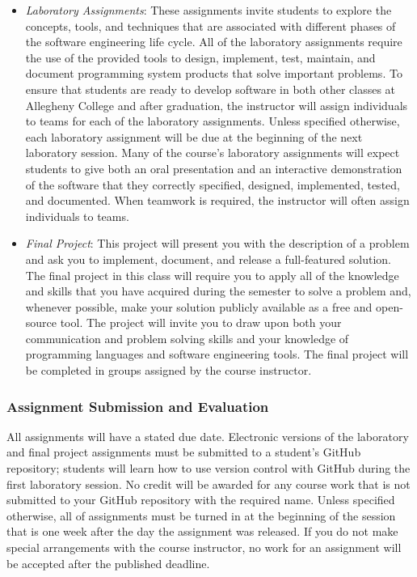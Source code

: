 \documentclass[11pt]{article}
\begin{document}
\begin{itemize}
  \item {\em Laboratory Assignments\/}: These assignments invite students to explore the concepts, tools, and techniques
    that are associated with different phases of the software engineering life cycle. All of the laboratory assignments
    require the use of the provided tools to design, implement, test, maintain, and document programming system products
    that solve important problems. To ensure that students are ready to develop software in both other classes at
    Allegheny College and after graduation, the instructor will assign individuals to teams for each of the laboratory
    assignments. Unless specified otherwise, each laboratory assignment will be due at the beginning of the next
    laboratory session. Many of the course's laboratory assignments will expect students to give both an oral
    presentation and an interactive demonstration of the software that they correctly specified, designed, implemented,
    tested, and documented. When teamwork is required, the instructor will often assign individuals to teams.

  \item {\em Final Project\/}: This project will present you with the description of a problem and ask you to implement,
    document, and release a full-featured solution. The final project in this class will require you to apply all of the
    knowledge and skills that you have acquired during the semester to solve a problem and, whenever possible, make your
    solution publicly available as a free and open-source tool. The project will invite you to draw upon both your
    communication and problem solving skills and your knowledge of programming languages and software engineering tools.
    The final project will be completed in groups assigned by the course instructor.

\end{itemize}

\subsubsection*{Assignment Submission and Evaluation}

All assignments will have a stated due date. Electronic versions of the laboratory and final project assignments must be
submitted to a student's GitHub repository; students will learn how to use version control with GitHub during the first
laboratory session. No credit will be awarded for any course work that is not submitted to your GitHub repository with
the required name. Unless specified otherwise, all of assignments must be turned in at the beginning of the session that
is one week after the day the assignment was released. If you do not make special arrangements with the course
instructor, no work for an assignment will be accepted after the published deadline.
\end{document}
